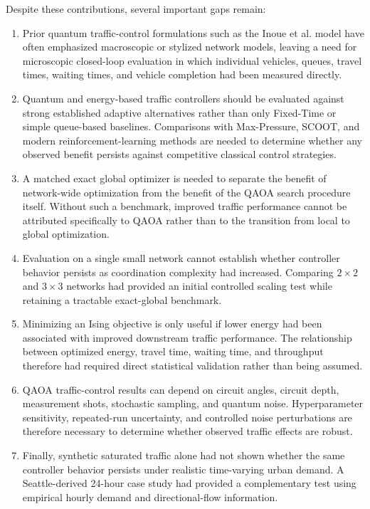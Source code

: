 Despite these contributions, several important gaps remain:

\begin{enumerate}
\item Prior quantum traffic-control formulations such as the Inoue et al. model have often emphasized
macroscopic or stylized network models, leaving a need for microscopic
closed-loop evaluation in which individual vehicles, queues, travel times,
waiting times, and vehicle completion had been measured directly.

\item Quantum and energy-based traffic controllers should be evaluated against
strong established adaptive alternatives rather than only Fixed-Time or simple
queue-based baselines. Comparisons with Max-Pressure, SCOOT, and modern
reinforcement-learning methods are needed to determine whether any observed
benefit persists against competitive classical control strategies.

\item A matched exact global optimizer is needed to separate the benefit of
network-wide optimization from the benefit of the QAOA search procedure itself.
Without such a benchmark, improved traffic performance cannot be attributed
specifically to QAOA rather than to the transition from local to global
optimization.

\item Evaluation on a single small network cannot establish whether controller
behavior persists as coordination complexity had increased. Comparing $2\times2$
and $3\times3$ networks had provided an initial controlled scaling test while
retaining a tractable exact-global benchmark.

\item Minimizing an Ising objective is only useful if lower energy had been associated
with improved downstream traffic performance. The relationship between
optimized energy, travel time, waiting time, and throughput therefore had required
direct statistical validation rather than being assumed.

\item QAOA traffic-control results can depend on circuit angles, circuit depth,
measurement shots, stochastic sampling, and quantum noise. Hyperparameter
sensitivity, repeated-run uncertainty, and controlled noise perturbations are
therefore necessary to determine whether observed traffic effects are robust.

\item Finally, synthetic saturated traffic alone had not shown whether the same
controller behavior persists under realistic time-varying urban demand.
A Seattle-derived 24-hour case study had provided a complementary test using
empirical hourly demand and directional-flow information.
\end{enumerate}

